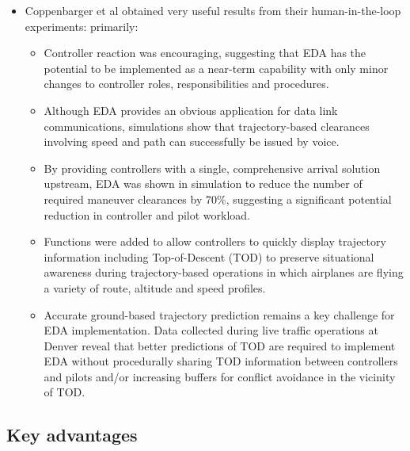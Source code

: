 \documentclass{aer1315-pretty}
\begin{document}
\begin{itemize}
\item Coppenbarger et al \cite{Copp:2010b}  obtained very useful results from their human-in-the-loop experiments: primarily:

\begin{itemize}
\item Controller reaction was encouraging, suggesting that EDA has the potential to be implemented as a near-term capability with only minor changes to controller roles, responsibilities and procedures. 
\item Although EDA provides an obvious application for data link communications, simulations show that trajectory-based clearances involving speed and path can successfully be issued by voice. 
\item By providing controllers with a single, comprehensive arrival solution upstream, EDA was shown in simulation to reduce the number of required maneuver clearances by $70\%$, suggesting a significant potential reduction in controller and pilot workload.
\item Functions were added to allow controllers to quickly display trajectory information  including Top-of-Descent (TOD) to preserve situational awareness during trajectory-based operations in which airplanes are flying a variety of route, altitude and speed profiles.
\item Accurate ground-based trajectory prediction remains a key challenge for EDA implementation. Data collected during live traffic operations at Denver reveal that better predictions of TOD are required to implement EDA without procedurally sharing TOD information between controllers and pilots and/or increasing buffers for conflict avoidance in the vicinity of TOD. 
\end{itemize}

\end{itemize}

\subsection{Key advantages} \label{ssec:comparisons}
\end{document}
